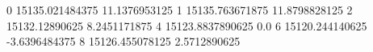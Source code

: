 0 15135.021484375 11.1376953125
1 15135.763671875 11.8798828125
2 15132.12890625 8.2451171875
4 15123.8837890625 0.0
6 15120.244140625 -3.6396484375
8 15126.455078125 2.5712890625
